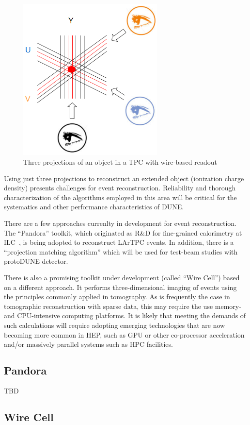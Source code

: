 \begin{figure}[h!]
	\centering
	\includegraphics[width=0.65\textwidth]{uvy_2.png}
	\caption{Three projections of an object in a TPC with wire-based readout}
	\label{fig:3projections}
\end{figure}

Using just three projections to reconstruct an extended object (ionization charge density) presents challenges for event reconstruction.
Reliability and thorough characterization of the algorithms employed in this area will be critical for the systematics and other performance characteristics of DUNE.

There are a few approaches currenlty in development for event reconstruction. The ``Pandora'' toolkit, which
originated as R\&D for fine-grained calorimetry at ILC~\cite{pandora}, is being adopted to reconstruct LArTPC events.
In addition, there is a ``projection matching algorithm'' which will be used for test-beam studies with protoDUNE detector.

There is also a promising toolkit under development (called ``Wire Cell'') based on a different approach.
It performs three-dimensional imaging of events using the principles commonly applied in tomography.
As is frequently the case in tomographic reconstruction with sparse data, this may require the use memory- and CPU-intensive computing platforms.
It is likely that meeting the demands of such calculations will require adopting emerging technologies that are now becoming more common in
HEP, such as GPU or other co-processor acceleration and/or massively parallel systems such as HPC facilities.

\subsection{Pandora}
TBD


\subsection{Wire Cell}
\label{sec:wirecell}

